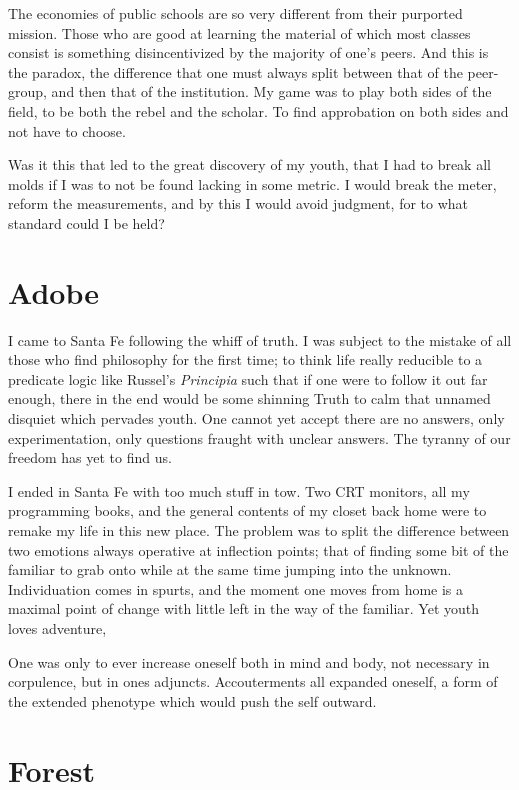 \documentclass[ebook, 10pt, openright, onecolumn]{memoir}
\begin{document}
The economies of public schools are so very different from their purported
mission.  Those who are good at learning the material of which most classes
consist is something disincentivized by the majority of one's peers.  And this
is the paradox, the difference that one must always split between that of the
peer-group, and then that of the institution.  My game was to play both sides of
the field, to be both the rebel and the scholar.  To find approbation on both
sides and not have to choose.

Was it this that led to the great discovery of my youth, that I had to break all
molds if I was to not be found lacking in some metric.  I would break the
meter, reform the measurements, and by this I would avoid judgment, for to what
standard could I be held?  

\chapter{Adobe}
\label{cha:adobe}
I came to Santa Fe following the whiff of truth.  I was subject to the mistake
of all those who find philosophy for the first time; to think life really
reducible to a predicate logic like Russel's \textit{Principia} such that if one
were to follow it out far enough, there in the end would be some shinning Truth
to calm that unnamed disquiet which pervades youth.  One cannot yet accept there
are no answers, only experimentation, only questions fraught with unclear
answers.  The tyranny of our freedom has yet to find us.

I ended in Santa Fe with too much stuff in tow.  Two CRT monitors, all my
programming books, and the general contents of my closet back home were to
remake my life in this new place.  The problem was to split the difference
between two emotions always operative at inflection points; that of finding some
bit of the familiar to grab onto while at the same time jumping into the
unknown.  Individuation comes in spurts, and the moment one moves from home
is a maximal point of change with little left in the way of the familiar.  Yet
youth loves adventure, 

One was only to ever increase oneself both in mind and body, not
necessary in corpulence, but in ones adjuncts.  Accouterments all expanded
oneself, a form of the extended phenotype which would push the self outward.

\chapter{Forest}
\label{cha:forest}
\end{document}
